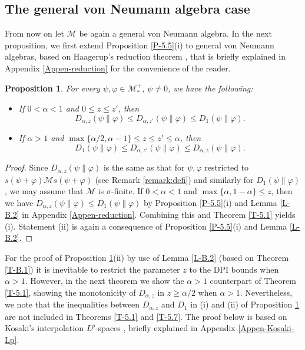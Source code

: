 \documentclass[12pt]{article}
\newtheorem{prop}[theorem]{Proposition}
\theoremstyle{definition}
\theoremstyle{remark}
\numberwithin{equation}{section}
\def\Me{\mathcal M}
\def\ffi{\varphi}
\begin{document}
\subsection{The general von Neumann algebra case}\label{Sec-5.2}


From now on let $\Me$ be again a general von Neumann algebra. In the next proposition, we first
extend Proposition \ref{P-5.5}(i) to general von Neumann algebras, based on Haagerup's reduction
theorem \cite{haagerup2010areduction}, that is briefly explained in Appendix \ref{Appen-reduction} for
the convenience of the reader.

\begin{prop}\label{P-5.6}
For every $\psi,\ffi\in\Me_*^+$, $\psi\ne0$, we have the following:
\begin{itemize}
\item[(i)] If $0<\alpha<1$ and $0\le z\le z'$, then
\[
D_{\alpha,z}(\psi\|\ffi)\le D_{\alpha,z'}(\psi\|\ffi)\le D_1(\psi\|\ffi).
\]
\item[(ii)] If $\alpha>1$ and $\max\{\alpha/2,\alpha-1\}\le z\le z'\le\alpha$, then
\[
D_1(\psi\|\ffi)\le D_{\alpha,z'}(\psi\|\ffi)\le D_{\alpha,z}(\psi\|\ffi).
\]
\end{itemize}
\end{prop}

\begin{proof}
Since $D_{\alpha,z}(\psi\|\ffi)$ is the same as that for $\psi,\ffi$ restricted to $s(\psi+\ffi)\Me s(\psi+\ffi)$
(see Remark \ref{remark:defi}) and similarly for $D_1(\psi\|\ffi)$, we may assume that $\Me$ is
$\sigma$-finite. If $0<\alpha<1$ and $\max\{\alpha,1-\alpha\}\le z$, then we have
$D_{\alpha,z}(\psi\|\ffi)\le D_1(\psi\|\ffi)$ by Proposition \ref{P-5.5}(i) and Lemma \ref{L-B.2} in
Appendix \ref{Appen-reduction}. Combining this and Theorem \ref{T-5.1} yields (i). Statement (ii) is
again a consequence of Proposition \ref{P-5.5}(i) and Lemma \ref{L-B.2}.
\end{proof}

For the proof of Proposition \ref{P-5.6}(ii) by use of Lemma \ref{L-B.2} (based on Theorem \ref{T-B.1})
it is inevitable to restrict the parameter $z$ to the DPI bounds when $\alpha>1$. However, in the next
theorem we show the $\alpha>1$ counterpart of Theorem \ref{T-5.1}, showing the monotonicity of
$D_{\alpha,z}$ in $z\ge\alpha/2$ when $\alpha>1$. Nevertheless, we note that the inequalities between
$D_{\alpha,z}$ and $D_1$ in (i) and (ii) of Proposition \ref{P-5.6} are not included in
Theorems \ref{T-5.1} and \ref{T-5.7}. The proof below is based on Kosaki's interpolation $L^p$-spaces
\cite{kosaki1984applications}, briefly explained in Appendix \ref{Appen-Kosaki-Lp}.
\end{document}
